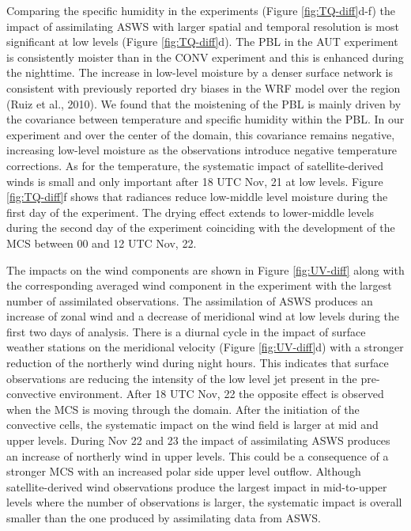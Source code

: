 \documentclass[final,5p,times,twocolumn,authoryear]{elsarticle} %
\begin{document}
Comparing the specific humidity in the experiments (Figure \ref{fig:TQ-diff}d-f) the impact of assimilating ASWS with larger spatial and temporal resolution is most significant at low levels (Figure \ref{fig:TQ-diff}d). The PBL in the AUT experiment is consistently moister than in the CONV experiment and this is enhanced during the nighttime. The increase in low-level moisture by a denser surface network is consistent with previously reported dry biases in the WRF model over the region (Ruiz et al., 2010). We found that the moistening of the PBL is mainly driven by the covariance between temperature and specific humidity within the PBL. In our experiment and over the center of the domain, this covariance remains negative, increasing low-level moisture as the observations introduce negative temperature corrections. As for the temperature, the systematic impact of satellite-derived winds is small and only important after 18 UTC Nov, 21 at low levels. Figure \ref{fig:TQ-diff}f shows that radiances reduce low-middle level moisture during the first day of the experiment. The drying effect extends to lower-middle levels during the second day of the experiment coinciding with the development of the MCS between 00 and 12 UTC Nov, 22.

The impacts on the wind components are shown in Figure \ref{fig:UV-diff} along with the corresponding averaged wind component in the experiment with the largest number of assimilated observations. The assimilation of ASWS produces an increase of zonal wind and a decrease of meridional wind at low levels during the first two days of analysis. There is a diurnal cycle in the impact of surface weather stations on the meridional velocity (Figure \ref{fig:UV-diff}d) with a stronger reduction of the northerly wind during night hours. This indicates that surface observations are reducing the intensity of the low level jet present in the pre-convective environment. After 18 UTC Nov, 22 the opposite effect is observed when the MCS is moving through the domain. After the initiation of the convective cells, the systematic impact on the wind field is larger at mid and upper levels. During Nov 22 and 23 the impact of assimilating ASWS produces an increase of northerly wind in upper levels. This could be a consequence of a stronger MCS with an increased polar side upper level outflow. Although satellite-derived wind observations produce the largest impact in mid-to-upper levels where the number of observations is larger, the systematic impact is overall smaller than the one produced by assimilating data from ASWS.
\end{document}
